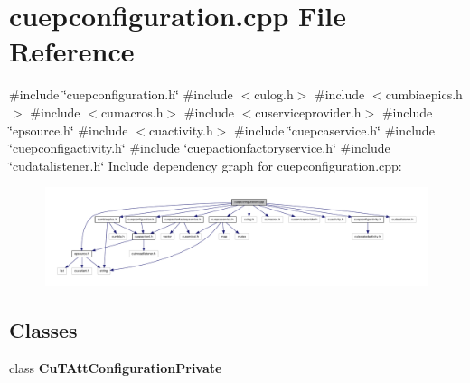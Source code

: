 \section{cuepconfiguration.\+cpp File Reference}
\label{cuepconfiguration_8cpp}
{\ttfamily \#include \char`\"{}cuepconfiguration.\+h\char`\"{}}\newline
{\ttfamily \#include $<$culog.\+h$>$}\newline
{\ttfamily \#include $<$cumbiaepics.\+h$>$}\newline
{\ttfamily \#include $<$cumacros.\+h$>$}\newline
{\ttfamily \#include $<$cuserviceprovider.\+h$>$}\newline
{\ttfamily \#include \char`\"{}epsource.\+h\char`\"{}}\newline
{\ttfamily \#include $<$cuactivity.\+h$>$}\newline
{\ttfamily \#include \char`\"{}cuepcaservice.\+h\char`\"{}}\newline
{\ttfamily \#include \char`\"{}cuepconfigactivity.\+h\char`\"{}}\newline
{\ttfamily \#include \char`\"{}cuepactionfactoryservice.\+h\char`\"{}}\newline
{\ttfamily \#include \char`\"{}cudatalistener.\+h\char`\"{}}\newline
Include dependency graph for cuepconfiguration.\+cpp\+:\nopagebreak
\begin{figure}[H]
\begin{center}
\leavevmode
\includegraphics[width=350pt]{cuepconfiguration_8cpp__incl}
\end{center}
\end{figure}
\subsection*{Classes}
\begin{DoxyCompactItemize}
\item 
class \textbf{ Cu\+T\+Att\+Configuration\+Private}
\end{DoxyCompactItemize}
